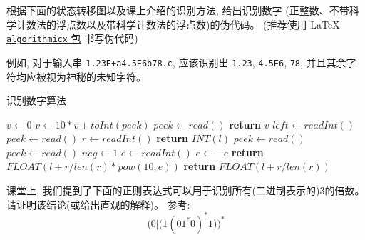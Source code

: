 \documentclass[a4paper, justified]{tufte-handout}
\begin{document}
\begin{problem}[手写词法分析器]
  根据下面的状态转移图以及课上介绍的识别方法, 给出识别数字
  (正整数、不带科学计数法的浮点数以及带科学计数法的浮点数)的伪代码。
  (推荐使用 \LaTeX{} 
  \href{http://tug.ctan.org/macros/latex/contrib/algorithmicx/algorithmicx.pdf}{\texttt{algorithmicx} 包}
  书写伪代码)


  例如, 对于输入串 \texttt{1.23E+a4.5E6b78.c}, 
  应该识别出 \texttt{1.23}, \texttt{4.5E6}, \texttt{78},
  并且其余字符均应被视为神秘的未知字符。
\end{problem}

\begin{solution}
\end{solution}

\begin{algorithm}
  \caption{识别数字算法} 
  \begin{algorithmic}[1]
      \State $v\gets 0$
        \State $v\gets 10*v+toInt(peek)$
        \State $peek \gets read()$
      \EndWhile
      \State  \textbf{return} $v$
    \EndFunction
     
      \State $left \gets readInt()$  
                       
        \State $peek \gets read()$
        \State $r \gets readInt()$
        \State  \textbf{return} $INT(l)$ 
      \EndIf
        \State $peek \gets read()$
          \State $peek \gets read()$
          \State $neg \gets 1$
        \EndIf
        \State $e \gets readInt()$ 
        \State $e \gets -e$ 
        \EndIf
        \State \textbf{return} $FLOAT(l+r/len(r)*pow(10,e))$ 
        \State \textbf{return} $FLOAT(l+r/len(r))$ 
      \EndIf
    \EndProcedure
  \end{algorithmic}
\end{algorithm}

\begin{problem}[正则表达式]
  课堂上, 我们提到了下面的正则表达式可以用于识别所有(二进制表示的)3的倍数。
  请证明该结论(或给出直观的解释)。
  参考: 
  \[ 
    \Big(0|\big(1(01^{\ast}0)^{\ast}1\big)\Big)^{\ast} 
  \]
\end{problem}
\end{document}
